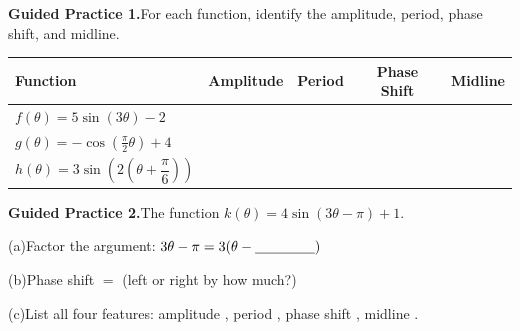 \documentclass[10pt]{article}
\begin{document}
\vspace{0.08in}

\begin{practicebox}

\textbf{Guided Practice 1.}\quad For each function, identify the amplitude,
period, phase shift, and midline.

\vspace{4pt}
\renewcommand{\arraystretch}{1.8}
\begin{tabular}{|l|c|c|c|c|}
\hline
\textbf{Function} & \textbf{Amplitude} & \textbf{Period} & \textbf{Phase Shift} & \textbf{Midline} \\
\hline
$f(\theta) = 5\sin(3\theta) - 2$ & & & & \\
\hline
$g(\theta) = -\cos\!\left(\tfrac{\pi}{2}\theta\right) + 4$ & & & & \\
\hline
$h(\theta) = 3\sin\!\left(2\left(\theta + \dfrac{\pi}{6}\right)\right)$ & & & & \\
\hline
\end{tabular}

\vspace{0.10in}
\textbf{Guided Practice 2.}\quad The function $k(\theta) = 4\sin(3\theta - \pi) + 1$.

\vspace{4pt}
(a)\quad Factor the argument: $3\theta - \pi = 3\!\left(\theta - \underline{\hspace{1.5cm}}\right)$

\vspace{4pt}
(b)\quad Phase shift $= $ \underline{\hspace{2.5cm}} (left or right by how much?)

\vspace{4pt}
(c)\quad List all four features: amplitude \underline{\hspace{1.5cm}},
period \underline{\hspace{1.5cm}}, phase shift \underline{\hspace{1.5cm}},
midline \underline{\hspace{1.5cm}}.

\end{practicebox}
\end{document}
